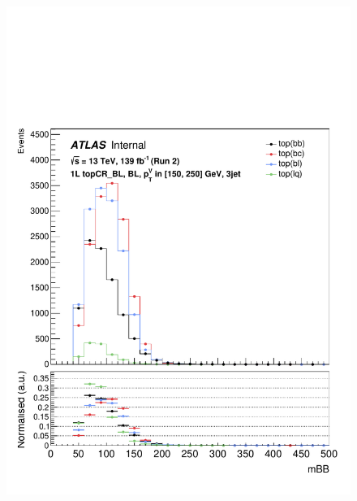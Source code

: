 \begin{figure}[h!]
\includegraphics[scale=0.253]{Images/VH/top/OneLepton_top_1bltag3jet_topCR_BL_150_250ptv_mBB.pdf}

\end{figure}
